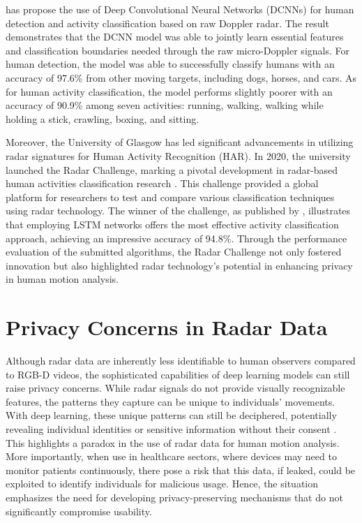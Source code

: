 \documentclass{l4proj}
\begin{document}
\cite{Micro-DopplerCNN_Experiment} has propose the use of Deep Convolutional Neural Networks (DCNNs) for human detection and activity classification based on raw Doppler radar. The result demonstrates that the DCNN model was able to jointly learn essential features and classification boundaries needed through the raw micro-Doppler signals. For human detection, the model was able to successfully classify humans with an accuracy of 97.6\% from other moving targets, including dogs, horses, and cars. As for human activity classification, the model performs slightly poorer with an accuracy of 90.9\% among seven activities: running, walking, walking while holding a stick, crawling, boxing, and sitting.

Moreover, the University of Glasgow has led significant advancements in utilizing radar signatures for Human Activity Recognition (HAR). In 2020, the university launched the Radar Challenge, marking a pivotal development in radar-based human activities classification research \citep{radar_challenge_university_of_glasgow}. This challenge provided a global platform for researchers to test and compare various classification techniques using radar technology. The winner of the challenge, as published by \cite{HAR_radar_challenge_winner_LSTM}, illustrates that employing LSTM networks offers the most effective activity classification approach, achieving an impressive accuracy of 94.8\%. Through the performance evaluation of the submitted algorithms, the Radar Challenge not only fostered innovation but also highlighted radar technology's potential in enhancing privacy in human motion analysis.

\section{Privacy Concerns in Radar Data}
Although radar data are inherently less identifiable to human observers compared to RGB-D videos, the sophisticated capabilities of deep learning models can still raise privacy concerns. While radar signals do not provide visually recognizable features, the patterns they capture can be unique to individuals’ movements. With deep learning, these unique patterns can still be deciphered, potentially revealing individual identities or sensitive information without their consent \citep{mmWave_radar_for_people_identification, person_identification_using_FMCW_radar, detection_of_human_targets_in_radar}. This highlights a paradox in the use of radar data for human motion analysis. More importantly, when use in healthcare sectors, where devices may need to monitor patients continuously, there pose a risk that this data, if leaked, could be exploited to identify  individuals for malicious usage. Hence, the situation emphasizes the need for developing privacy-preserving mechanisms that do not significantly compromise usability.
\end{document}
